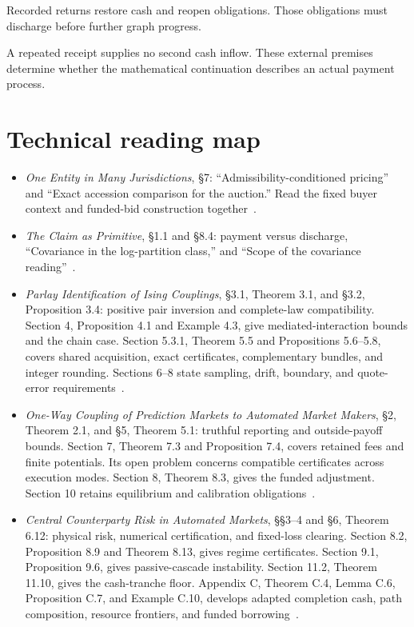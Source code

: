 \documentclass{momentum}
\begin{document}
Recorded returns restore cash and reopen obligations. Those obligations must discharge before further graph progress.

A repeated receipt supplies no second cash inflow. These external premises determine whether the mathematical continuation describes an actual payment process.

\section{Technical reading map}

\begin{itemize}
\item \emph{One Entity in Many Jurisdictions}, \S7: ``Admissibility-conditioned pricing'' and ``Exact accession comparison for the auction.'' Read the fixed buyer context and funded-bid construction together~\cite{entity}.

\item \emph{The Claim as Primitive}, \S1.1 and \S8.4: payment versus discharge, ``Covariance in the log-partition class,'' and ``Scope of the covariance reading''~\cite{claim}.

\item \emph{Parlay Identification of Ising Couplings}, \S3.1, Theorem 3.1, and \S3.2, Proposition 3.4: positive pair inversion and complete-law compatibility. Section 4, Proposition 4.1 and Example 4.3, give mediated-interaction bounds and the chain case. Section 5.3.1, Theorem 5.5 and Propositions 5.6--5.8, covers shared acquisition, exact certificates, complementary bundles, and integer rounding. Sections 6--8 state sampling, drift, boundary, and quote-error requirements~\cite{parlay}.

\item \emph{One-Way Coupling of Prediction Markets to Automated Market Makers}, \S2, Theorem 2.1, and \S5, Theorem 5.1: truthful reporting and outside-payoff bounds. Section 7, Theorem 7.3 and Proposition 7.4, covers retained fees and finite potentials. Its open problem concerns compatible certificates across execution modes. Section 8, Theorem 8.3, gives the funded adjustment. Section 10 retains equilibrium and calibration obligations~\cite{coupling}.

\item \emph{Central Counterparty Risk in Automated Markets}, \S\S3--4 and \S6, Theorem 6.12: physical risk, numerical certification, and fixed-loss clearing. Section 8.2, Proposition 8.9 and Theorem 8.13, gives regime certificates. Section 9.1, Proposition 9.6, gives passive-cascade instability. Section 11.2, Theorem 11.10, gives the cash-tranche floor. Appendix C, Theorem C.4, Lemma C.6, Proposition C.7, and Example C.10, develops adapted completion cash, path composition, resource frontiers, and funded borrowing~\cite{ccp}.
\end{itemize}
\end{document}

